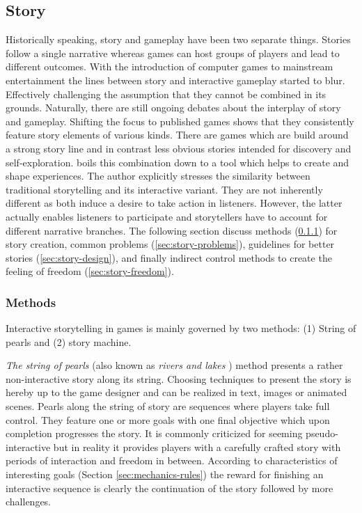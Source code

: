 \subsection{Story} \label{sec:story}
Historically speaking, story and gameplay have been two separate things.
Stories follow a single narrative whereas games can host groups of players and lead to different outcomes.
With the introduction of computer games to mainstream entertainment the lines between story and interactive gameplay started to blur.
Effectively challenging the assumption that they cannot be combined in its grounds.
Naturally, there are still ongoing debates about the interplay of story and gameplay.
Shifting the focus to published games shows that they consistently feature story elements of various kinds.
There are games which are build around a strong story line and in contrast less obvious stories intended for discovery and self-exploration.
\citeauthor{Schell2014} boils this combination down to a tool which helps to create and shape experiences.
The author explicitly stresses the similarity between traditional storytelling and its interactive variant.
They are not inherently different as both induce a desire to take action in listeners.
However, the latter actually enables listeners to participate and storytellers have to account for different narrative branches.
The following section discuss methods (\ref{sec:story-methods}) for story creation, common problems  (\ref{sec:story-problems}), guidelines for better stories  (\ref{sec:story-design}), and finally indirect control methods to create the feeling of freedom  (\ref{sec:story-freedom}).

\subsubsection{Methods} \label{sec:story-methods}
Interactive storytelling in games is mainly governed by two methods: (1) String of pearls and (2) story machine.

\textit{The string of pearls} (also known as \textit{rivers and lakes} \cite{Schell2014}) method presents a rather non-interactive story along its string.
Choosing techniques to present the story is hereby up to the game designer and can be realized in text, images or animated scenes.
Pearls along the string of story are sequences where players take full control.
They feature one or more goals with one final objective which upon completion progresses the story.
It is commonly criticized for seeming pseudo-interactive but in reality it provides players with a carefully crafted story with periods of interaction and freedom in between.
According to characteristics of interesting goals (Section \ref{sec:mechanics-rules}) the reward for finishing an interactive sequence is clearly the continuation of the story followed by more challenges.

